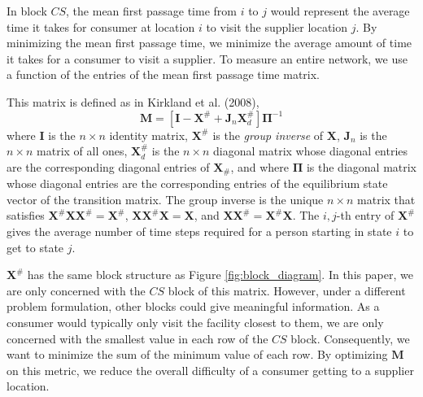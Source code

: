 \documentclass[twoside,twocolumn]{article}
\begin{document}

In block $CS$, the mean first passage time from $i$ to $j$ would represent the average time it takes for consumer at location $i$ to visit the supplier location $j$.
By minimizing the mean first passage time, we minimize the average amount of time it takes for a consumer to visit a supplier.
To measure an entire network, we use a function of the entries of the mean first passage time matrix.

This matrix is defined as in Kirkland et al. (2008),
$$ \textbf{M} = [\textbf{I} - \textbf{X}^{\#} + \textbf{J}_{n}\textbf{X}_{d}^{\#}]\mathbf{\Pi}^{-1}$$
where $\textbf{I}$ is the $n \times n$ identity matrix, $\textbf{X}^{\#}$ is the {\em group inverse} of $\textbf{X}$, $\textbf{J}_{n}$ is the $n \times n$ matrix of all ones, $\textbf{X}_{d}^{\#}$ is the $n \times n$ diagonal matrix whose diagonal entries are the corresponding diagonal entries of $\textbf{X}_{\#}$, and where $\mathbf{\Pi}$ is the diagonal matrix whose diagonal entries are the corresponding entries of the equilibrium state vector of the transition matrix.%
 The group inverse is the unique $n \times n$ matrix that satisfies $\textbf{X}^{\#}\textbf{X}\textbf{X}^{\#} = \textbf{X}^{\#}$, $\textbf{X}\textbf{X}^{\#}\textbf{X} = \textbf{X}$, and $\textbf{X}\textbf{X}^{\#} = \textbf{X}^{\#}\textbf{X}$.
The $i, j$-th entry of $\textbf{X}^{\#}$ gives the average number of time steps required for a person starting in state $i$ to get to state $j$.

 $\textbf{X}^{\#}$ has the same block structure as Figure \ref{fig:block_diagram}.
In this paper, we are only concerned with the $CS$ block of this matrix.
However, under a different problem formulation, other blocks could give meaningful information.
As a consumer would typically only visit the facility closest to them, we are only concerned with the smallest value in each row of the $CS$ block.
Consequently, we want to minimize the sum of the minimum value of each row.
By optimizing $\textbf{M}$ on this metric, we reduce the overall difficulty of a consumer getting to a supplier location.
\end{document}
